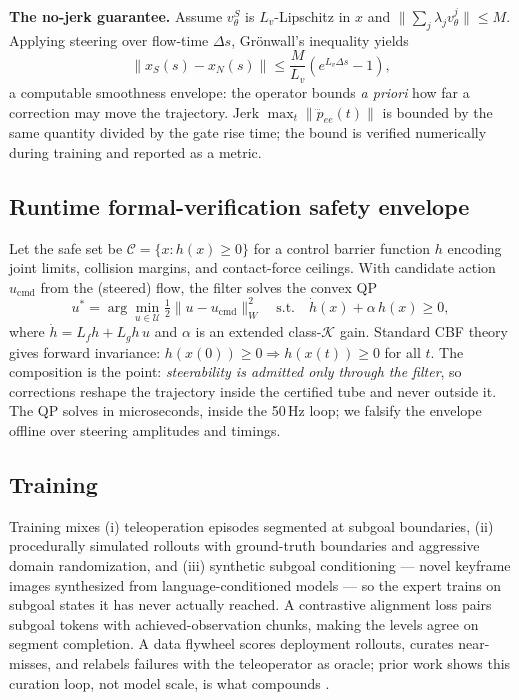 \documentclass[conference,10pt]{IEEEtran}
\begin{document}
\textbf{The no-jerk guarantee.} Assume $v_\theta^{S}$ is $L_v$-Lipschitz in $x$ and $\|\sum_j \lambda_j v_\theta^{j}\| \le M$. Applying steering over flow-time $\Delta s$, Gr\"onwall's inequality yields
\begin{equation}
\big\| x_S(s) - x_N(s) \big\| \le \frac{M}{L_v}\left(e^{L_v \Delta s} - 1\right),
\label{eq:gronwall}
\end{equation}
a computable smoothness envelope: the operator bounds \emph{a priori} how far a correction may move the trajectory. Jerk $\max_t \|\dddot p_{ee}(t)\|$ is bounded by the same quantity divided by the gate rise time; the bound is verified numerically during training and reported as a metric.

\subsection{Runtime formal-verification safety envelope}
\label{sec:safety}
Let the safe set be $\mathcal{C} = \{x : h(x) \ge 0\}$ for a control barrier function $h$ encoding joint limits, collision margins, and contact-force ceilings. With candidate action $u_{\mathrm{cmd}}$ from the (steered) flow, the filter solves the convex QP
\begin{equation}
u^{*} = \arg\min_{u \in \mathcal{U}} \tfrac12 \| u - u_{\mathrm{cmd}} \|_W^2
\quad \text{s.t.} \quad \dot h(x) + \alpha\, h(x) \ge 0,
\label{eq:cbfqp}
\end{equation}
where $\dot h = L_f h + L_g h\, u$ and $\alpha$ is an extended class-$\mathcal{K}$ gain. Standard CBF theory \cite{ames2014,ames2019} gives forward invariance: $h(x(0)) \ge 0 \Rightarrow h(x(t)) \ge 0$ for all $t$. The composition is the point: \emph{steerability is admitted only through the filter}, so corrections reshape the trajectory inside the certified tube and never outside it. The QP solves in microseconds, inside the 50\,Hz loop; we falsify the envelope offline over steering amplitudes and timings.

\subsection{Training}
\label{sec:train}
Training mixes (i) teleoperation episodes segmented at subgoal boundaries, (ii) procedurally simulated rollouts with ground-truth boundaries and aggressive domain randomization, and (iii) synthetic subgoal conditioning --- novel keyframe images synthesized from language-conditioned models --- so the expert trains on subgoal states it has never actually reached. A contrastive alignment loss pairs subgoal tokens with achieved-observation chunks, making the levels agree on segment completion. A data flywheel scores deployment rollouts, curates near-misses, and relabels failures with the teleoperator as oracle; prior work shows this curation loop, not model scale, is what compounds \cite{datafly}.
\end{document}
